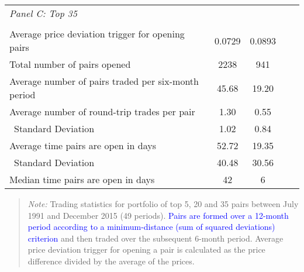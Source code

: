 \documentclass[titlepage]{elsarticle}
\begin{document}
\begin{table}[!http]
\begin{tabular}{lcccc}
			 \multicolumn{1}{l}{\textit{Panel C: Top 35}} \\
			&&\vspace{-.3cm}\\
			Average price deviation trigger for opening pairs & 0.0729 & 0.0893   \\
			Total number of pairs opened & 2238  & 941   \\
			Average number of pairs traded per six-month period & 45.68 & 19.20 \\
			Average number of round-trip trades per pair & 1.30 & 0.55   \\
			~Standard Deviation & 1.02 & 0.84   \\
			Average time pairs are open in days & 52.72 &  19.35   \\
			~Standard Deviation & 40.48 & 30.56  \\
			Median time pairs are open in days & 42    & 6           \\
	\bottomrule
\end{tabular}%
\begin{quote}
\item \textit{Note:} \footnotesize  Trading statistics for portfolio of top 5, 20 and 35 pairs between July 1991 and December 2015 (49 periods). \textcolor{blue} {Pairs are formed over a 12-month period according to a minimum-distance (sum of squared deviations) criterion} and then traded over the subsequent 6-month period. Average price deviation trigger for opening a pair is calculated as the price difference divided by the average of the prices.
\end{quote}
\label{tab:table102}%
\end{table}%
		
\end{document}
